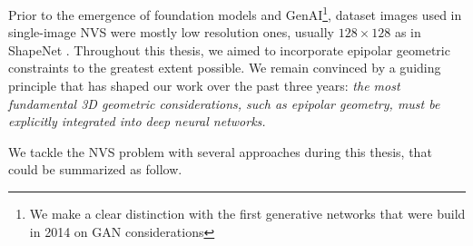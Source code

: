 Prior to the emergence of foundation models \citep{awais2023foundational} and \ac{GenAI}\footnote{We make a clear distinction with the first generative networks that were build in 2014 on \ac{GAN} \citep{goodfellow2014generative} considerations}, dataset images used in single-image \ac{NVS} were mostly low resolution ones, usually $128\times128$ as in ShapeNet \citep{chang2015shapenet}. Throughout this thesis, we aimed to incorporate epipolar geometric constraints to the greatest extent possible. We remain convinced by a guiding principle that has shaped our work over the past three years: \textit{the most fundamental 3D geometric considerations, such as epipolar geometry, must be explicitly integrated into deep neural networks.}

We tackle the \ac{NVS} problem with several approaches during this thesis, that could be summarized as follow.
